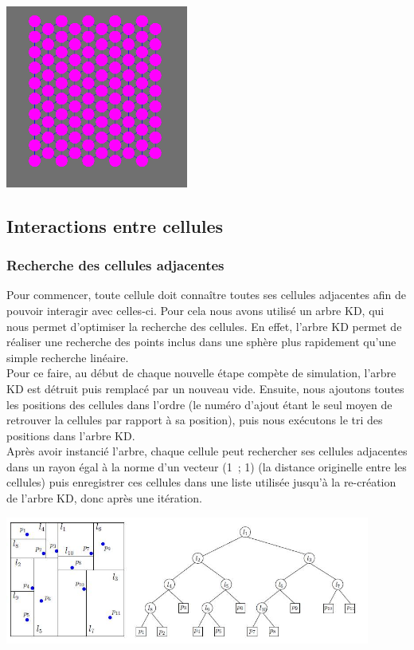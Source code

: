 \documentclass[a4paper,11pt]{article}
\begin{document}
\begin{center}
  \includegraphics[width=6cm]{Images/hexagone.png}
\end{center}

\subsection{Interactions entre cellules}

\subsubsection{Recherche des cellules adjacentes}

Pour commencer, toute cellule doit connaître toutes ses cellules adjacentes afin de pouvoir interagir avec celles-ci.
Pour cela nous avons utilisé un arbre KD, qui nous permet d'optimiser la recherche des cellules. En effet, l'arbre KD permet de réaliser une recherche des points inclus dans une sphère plus rapidement qu'une simple recherche linéaire. \\
Pour ce faire, au début de chaque nouvelle étape compète de simulation, l'arbre KD est détruit puis remplacé par un nouveau vide. Ensuite, nous ajoutons toutes les positions des cellules dans l'ordre (le numéro d'ajout étant le seul moyen de retrouver la cellules par rapport à sa position), puis nous exécutons le tri des positions dans l'arbre KD.\\
Après avoir instancié l'arbre, chaque cellule peut rechercher ses cellules adjacentes dans un rayon égal à la norme d'un vecteur (1~; 1) (la distance originelle entre les cellules) puis enregistrer ces cellules dans une liste utilisée jusqu'à la re-création de l'arbre KD, donc après une itération.

\begin{center}
  \includegraphics[width=12cm]{Images/kd_tree.jpg}
\end{center}
\end{document}

